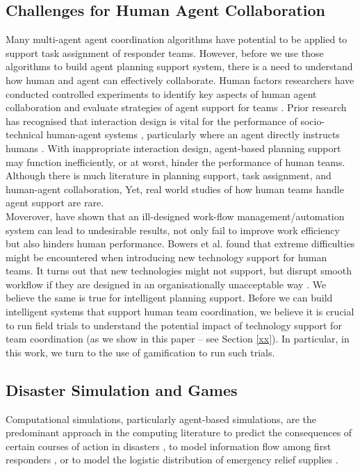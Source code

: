 \subsection{Challenges for Human Agent Collaboration}
Many multi-agent agent coordination algorithms have potential to be applied to support task assignment of responder teams. However, before we use those algorithms to build agent planning support system, there is a need to understand how human and agent can effectively collaborate.  Human factors researchers have conducted controlled experiments to identify key aspects of human agent collaboration \cite{Bradshaw 2011, Cooke2007 ,Sukthankar2009, Wagner2004} and evaluate strategies of agent support for teams \cite{Lenox1998,Lenox2000,(Nourjou et al 2011) }. Prior research has recognised that interaction design is vital for the performance of socio-technical human-agent systems \cite{Murthy1997}, particularly where an agent directly instructs humans \cite{S. Moran2013}. With inappropriate interaction design, agent-based planning support may function inefficiently, or at worst, hinder the performance of human teams. Although there is much literature in planning support, task assignment, and human-agent collaboration, Yet, real world studies of how human teams handle agent support are rare. \\

Moverover, \cite{Bowers1994} have shown that an ill-designed work-flow management/automation system can lead to undesirable results, not only fail to improve work efficiency but also hinders human performance. Bowers et al. found that extreme difficulties might be encountered when introducing new technology support for human teams. It turns out that new technologies might not support, but  disrupt smooth workflow if they are designed in an organisationally unacceptable way \cite{Abbott1994}. We believe the same is true for intelligent planning support. Before we can build intelligent systems that support human team coordination, we believe it is crucial to run field trials to understand the potential impact of technology support for team coordination (as we show in this paper -- see Section \ref{xx}). In particular, in this work, we turn to the use of gamification to run such trials. \\

\subsection{Disaster Simulation and Games }
Computational simulations, particularly agent-based simulations, are the predominant approach in the computing literature to predict the consequences of certain courses of action in disasters \cite{Hawe et al., 2012}, to model information flow among first responders \cite{Robinson and Brown, 2005}, or to model the logistic distribution of emergency relief supplies \cite{Lee et al., 2007}.\\

